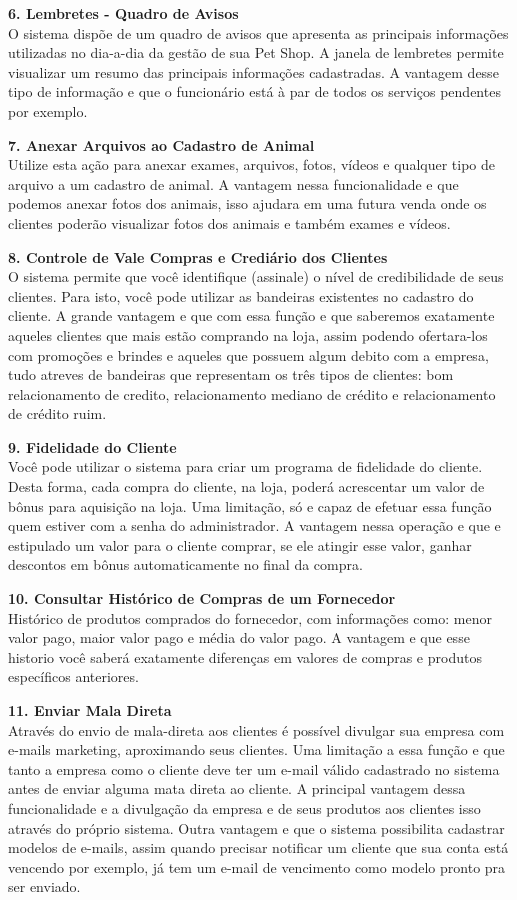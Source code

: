 \documentclass[12pt,openright,twoside,a4paper,english,french,spanish,brazil]{abntex2}
\begin{document}
\textbf{6.	Lembretes - Quadro de Avisos}\\
O sistema dispõe de um quadro de avisos que apresenta as principais informações utilizadas no dia-a-dia da gestão de sua Pet Shop. A janela de lembretes permite visualizar um resumo das principais informações cadastradas. A vantagem desse tipo de informação e que o funcionário está à par de todos os serviços pendentes por exemplo.

\textbf{7.	Anexar Arquivos ao Cadastro de Animal}\\
Utilize esta ação para anexar exames, arquivos, fotos, vídeos e qualquer tipo de arquivo a um cadastro de animal. A vantagem nessa funcionalidade e que podemos anexar fotos dos animais, isso ajudara em uma futura venda onde os clientes poderão visualizar fotos dos animais e também exames e vídeos.

\textbf{8.	Controle de Vale Compras e Crediário dos Clientes}\\
O sistema permite que você identifique (assinale) o nível de credibilidade de seus clientes. Para isto, você pode utilizar as bandeiras existentes no cadastro do cliente. A grande vantagem e que com essa função e que saberemos exatamente aqueles clientes que mais estão comprando na loja, assim podendo ofertara-los com promoções e brindes e aqueles que possuem algum debito com a empresa, tudo atreves de bandeiras que representam os três tipos de clientes: bom relacionamento de credito, relacionamento mediano de crédito e relacionamento de crédito ruim.

\textbf{9.	Fidelidade do Cliente}\\
Você pode utilizar o sistema para criar um programa de fidelidade do cliente. Desta forma, cada compra do cliente, na loja, poderá acrescentar um valor de bônus para aquisição na loja. Uma limitação, só e capaz de efetuar essa função quem estiver com a senha do administrador. A vantagem nessa operação e que e estipulado um valor para o cliente comprar, se ele atingir esse valor, ganhar descontos em bônus automaticamente no final da compra.

\textbf{10.	Consultar Histórico de Compras de um Fornecedor}\\
Histórico de produtos comprados do fornecedor, com informações como: menor valor pago, maior valor pago e média do valor pago. A vantagem e que esse historio você saberá exatamente diferenças em valores de compras e produtos específicos anteriores.

\textbf{11.	Enviar Mala Direta}\\
Através do envio de mala-direta aos clientes é possível divulgar sua empresa com e-mails marketing, aproximando seus clientes. Uma limitação a essa função e que tanto a empresa como o cliente deve ter um e-mail válido cadastrado no sistema antes de enviar alguma mata direta ao cliente. A principal vantagem dessa funcionalidade e a divulgação da empresa e de seus produtos aos clientes isso através do próprio sistema. Outra vantagem e que o sistema possibilita cadastrar modelos de e-mails, assim quando precisar notificar um cliente que sua conta está vencendo por exemplo, já tem um e-mail de vencimento como modelo pronto pra ser enviado.
 
\end{document}
